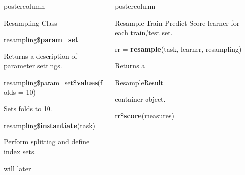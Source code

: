 \documentclass{beamer}
\newlength{\columnheight} %
\newcommand{\codeinline}[1]{\begin{codeboxinline}#1\end{codeboxinline}}
\begin{document}
\begin{withoutheader}
\begin{frame}[fragile]{}
\begin{columns}
\begin{column}{.245\textwidth}
\begin{beamercolorbox}[center]{postercolumn}
\begin{minipage}{.98\textwidth}
{\begin{myblock}{Resampling Class}
							\vspace{1em}
							\begin{codebox}
								resampling\$\textbf{param\_set}
							\end{codebox}
							Returns a description of parameter settings.
							\\
							\begin{codebox}
								resampling\$param\_set\$\textbf{values}(folds = 10)
							\end{codebox}
							Sets folds to 10.
							\\
							\begin{codebox}
								resampling\$\textbf{instantiate}(task)
							\end{codebox}
                            Perform splitting and define index sets. \codeinline{}  will later 
							\\
						\end{myblock}
						\vfill
					}
				\end{minipage}
			\end{beamercolorbox}
		\end{column}
		\begin{column}{.245\textwidth}
			\begin{beamercolorbox}[center]{postercolumn}
				\begin{minipage}{.98\textwidth}
					\parbox[t][\columnheight]{\textwidth}{
						\begin{myblock}{Resample}
                            Train-Predict-Score learner for each train/test set.
							\\
							\begin{codebox}
								rr = \textbf{resample}(task, learner, resampling)
							\end{codebox}
							Returns a \codeinline{ResampleResult} container object.
							\\
							\vspace{1em}
							\begin{codebox}
								rr\$\textbf{score}(measures)
							\end{codebox}

\end{myblock}}
\end{minipage}
\end{beamercolorbox}
\end{column}
\end{columns}
\end{frame}
\end{withoutheader}
\end{document}
